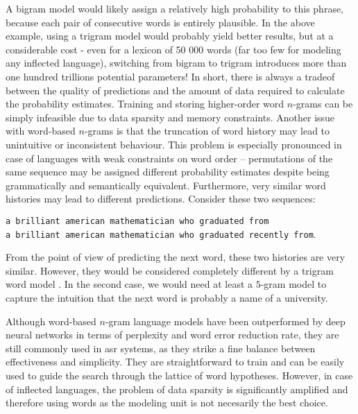 	A bigram model would likely assign a relatively high probability to this phrase, because each pair of consecutive words is entirely plausible. 
	In the above example, using a trigram model would probably yield better results, but at a considerable cost - even for a lexicon of 50 000 words (far too few for modeling any inflected language), switching from bigram to trigram introduces more than one hundred trillions potential parameters! In short, there is always a tradeof between the quality of predictions and the amount of data required to calculate the probability estimates. Training and storing higher-order word \mbox{$n$-gram}s can be simply infeasible due to data sparsity and memory constraints.
	Another issue with word-based \mbox{$n$-gram}s is that the truncation of word history may lead to unintuitive or inconsistent behaviour. This problem is especially pronounced in case of languages with weak constraints on word order -- permutations of the same sequence may be assigned different probability estimates despite being grammatically and semantically equivalent. Furthermore, very similar word histories may lead to different predictions. Consider these two sequences:
	\begin{center}
		\texttt{a brilliant american mathematician who graduated from} \\
		\texttt{a brilliant american mathematician who graduated recently from}.
	\end{center}
	From the point of view of predicting the next word, these two histories are very similar. However, they would be considered completely different by a trigram word model \cite{whittaker2000statistical}. In the second case, we would need at least a $5$-gram model to capture the intuition that the next word is probably a name of a university.

	Although word-based \mbox{$n$-gram} language models have been outperformed by deep neural networks in terms of perplexity and word error reduction rate, they are still commonly used in \gls{asr} systems, as they strike a fine balance between effectiveness and simplicity. They are straightforward to train and can be easily used to guide the search through the lattice of word hypotheses. However, in case of inflected languages, the problem of data sparsity is significantly amplified and therefore using words as the modeling unit is not necesarily the best choice.
